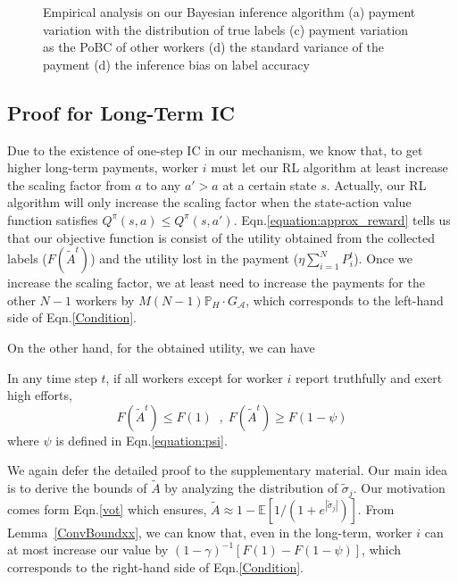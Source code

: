 \begin{figure}[!htb]
\begin{subfigure}[t]{0.32\textwidth}
        \caption{\label{BIM4}}
    \end{subfigure}
	\vspace{-3mm}
    \caption{\label{BIM}Empirical analysis on our Bayesian inference algorithm (a) payment variation with the distribution of true labels (c) payment variation as the PoBC of other workers (d) the standard variance of the payment (d) the inference bias on label accuracy}
\vspace{-3mm}
\end{figure}
\subsection{Proof for Long-Term IC}
Due to the existence of one-step IC in our mechanism, we know that, to get higher long-term payments, worker $i$ must let our RL algorithm at least increase the scaling factor from $a$ to any $a'>a$ at a certain state $s$.
Actually, our RL algorithm will only increase the scaling factor when the state-action value function satisfies $Q^{\pi}(s,a)\leq Q^{\pi}(s,a')$.
Eqn.\ref{equation:approx_reward} tells us that our objective function is consist of the utility obtained from the collected labels ($F(\tilde{A}^t)$) and the utility lost in the payment ($\eta {\sum}_{i=1}^{N}P^t_i$).
Once we increase the scaling factor, we at least need to increase the payments for the other $N-1$ workers by $M(N-1)\mathbb{P}_H\cdot G_{\mathcal{A}}$, which corresponds to the left-hand side of Eqn.\ref{Condition}.

On the other hand, for the obtained utility, we can have 
\begin{lemma}
\label{ConvBoundxx}
In any time step $t$, if all workers except for worker $i$ report truthfully and exert high efforts,
\begin{equation*}
F(\tilde{A}^t)\leq F(1) \;\;,\; F(\tilde{A}^t)\geq F(1-\psi)
\end{equation*}
where $\psi$ is defined in Eqn.\ref{equation:psi}.
\end{lemma}
We again defer the detailed proof to the supplementary material.
Our main idea is to derive the bounds of $\tilde{A}$ by analyzing the distribution of $\tilde{\sigma}_j$.
Our motivation comes form Eqn.\ref{vot} which ensures, $\tilde{A} \approx 1-\mathbb{E}[1/(1+e^{|\tilde{\sigma}_j|})]$. From Lemma~\ref{ConvBoundxx}, we can know that, even in the long-term, worker $i$ can at most increase our value by $(1-\gamma)^{-1}[F(1)-F(1-\psi)]$, which corresponds to the right-hand side of Eqn.\ref{Condition}.


